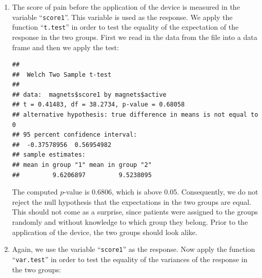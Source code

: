 \documentclass[]{krantz}
\makeatletter
\newenvironment{Shaded}{\begin{snugshade}}{\end{snugshade}}
\newcommand{\KeywordTok}[1]{\textcolor[rgb]{0.13,0.29,0.53}{\textbf{#1}}}
\newcommand{\StringTok}[1]{\textcolor[rgb]{0.31,0.60,0.02}{#1}}
\newcommand{\OperatorTok}[1]{\textcolor[rgb]{0.81,0.36,0.00}{\textbf{#1}}}
\newcommand{\NormalTok}[1]{#1}
\newenvironment{kframe}{%
\medskip{}
\setlength{\fboxsep}{.8em}
 \def\at@end@of@kframe{}%
 \ifinner\ifhmode%
  \def\at@end@of@kframe{\end{minipage}}%
  \begin{minipage}{\columnwidth}%
 \fi\fi%
 \def\FrameCommand##1{\hskip\@totalleftmargin \hskip-\fboxsep
 \colorbox{shadecolor}{##1}\hskip-\fboxsep
     \hskip-\linewidth \hskip-\@totalleftmargin \hskip\columnwidth}%
 \MakeFramed {\advance\hsize-\width
   \@totalleftmargin\z@ \linewidth\hsize
   \@setminipage}}%
 {\par\unskip\endMakeFramed%
 \at@end@of@kframe}
\renewenvironment{Shaded}{\begin{kframe}}{\end{kframe}}
\theoremstyle{definition}
\theoremstyle{definition}
\theoremstyle{definition}
\theoremstyle{remark}
\makeatother
\begin{document}
\begin{enumerate}
\def\labelenumi{\arabic{enumi}.}
\item
  The score of pain before the application of the device is measured in
  the variable ``\texttt{score1}''. This variable is used as the
  response. We apply the function ``\texttt{t.test}'' in order to test
  the equality of the expectation of the response in the two groups.
  First we read in the data from the file into a data frame and then we
  apply the test:

\begin{Shaded}
\end{Shaded}

\begin{verbatim}
## 
##  Welch Two Sample t-test
## 
## data:  magnets$score1 by magnets$active
## t = 0.41483, df = 38.2734, p-value = 0.68058
## alternative hypothesis: true difference in means is not equal to 0
## 95 percent confidence interval:
##  -0.37578956  0.56954982
## sample estimates:
## mean in group "1" mean in group "2" 
##         9.6206897         9.5238095
\end{verbatim}

  The computed \(p\)-value is 0.6806, which is above 0.05. Consequently,
  we do not reject the null hypothesis that the expectations in the two
  groups are equal. This should not come as a surprise, since patients
  were assigned to the groups randomly and without knowledge to which
  group they belong. Prior to the application of the device, the two
  groups should look alike.
\item
  Again, we use the variable ``\texttt{score1}'' as the response. Now
  apply the function ``\texttt{var.test}'' in order to test the equality
  of the variances of the response in the two groups:

\begin{Shaded}
\end{Shaded}


\end{enumerate}
\end{document}
